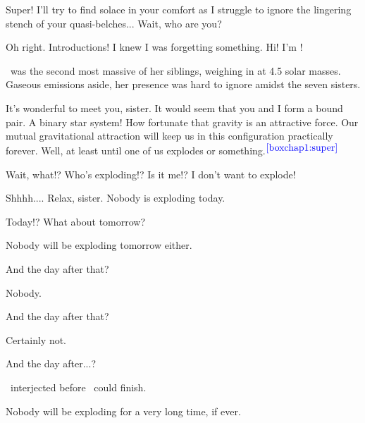 \documentclass[main.tex]{subfiles}
\begin{document}
\par \Sterope Super!  I'll try to find solace in your comfort as I struggle to ignore the lingering stench of your quasi-belches...  Wait, who are you?

\par \Merope Oh right.  Introductions! I knew I was forgetting something.   Hi!  I'm \rmmerope!

\par \nar \rmmerope~was the second most massive of her siblings, weighing in at 4.5 solar masses.  Gaseous emissions aside, her presence was hard to ignore amidst the seven sisters.  

\par \Maia It's wonderful to meet you, sister.  It would seem that you and I form a bound pair.  A binary star system!  How fortunate that gravity is an attractive force.  Our mutual gravitational attraction will keep us in this configuration practically forever.  Well, at least until one of us explodes or something.$^{\textcolor{blue}{\ref{boxchap1:super}}}$

\par \Merope Wait, what!?  Who's exploding!?  Is it me!?  I don't want to explode!

\par \Maia Shhhh....  Relax, sister.  Nobody is exploding today.  

\par \Merope Today!?  What about tomorrow?  

\par \Maia Nobody will be exploding tomorrow either.

\par \Merope And the day after that?

\par \Maia Nobody.

\par \Merope And the day after that?

\par \Maia Certainly not.

\par \Merope And the day after...?

\par \nar \rmmaia~interjected before \rmmerope~could finish.

\par \Maia Nobody will be exploding for a very long time, if ever.
\end{document}
